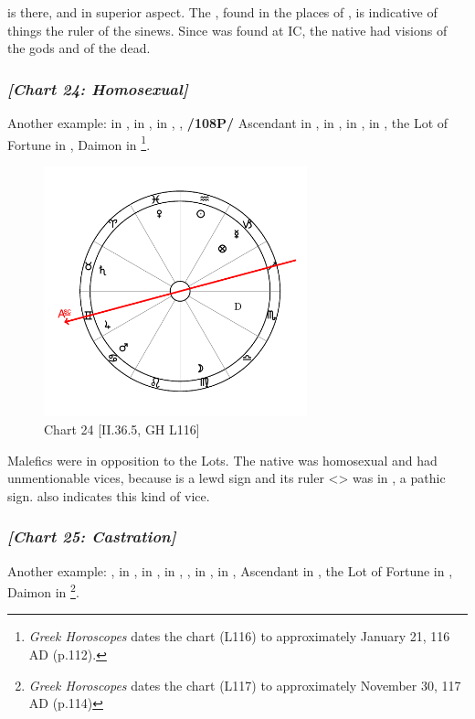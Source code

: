 \noindent \Mars\xspace is there, and \Saturn in superior aspect. The \Sun, found in the places of \Jupiter, is indicative of things the ruler of the sinews. Since \Saturn\xspace was found at IC, the native had visions of the gods and of the dead.

\newpage
\clearpage
\subsubsection{\textit{[Chart 24: Homosexual]}}
Another example: \Sun\xspace in \Aquarius, \Moon\xspace in \Virgo, \Saturn\xspace in \Taurus, \Jupiter, \textbf{/108P/} Ascendant in \Gemini, \Mars\xspace in \Cancer, \Venus\xspace in \Pisces, \Mercury\xspace in \Capricorn, the Lot of Fortune in \Capricorn, Daimon in \Scorpio
\footnote{\textit{Greek Horoscopes} dates the chart (L116) to approximately January 21, 116 AD (p.112).}.

\clearpage
\begin{figure}
\centering
\vspace{-30pt}
\includegraphics[width=0.68\textwidth]{charts/2_36_5}
\caption{Chart 24 [II.36.5, GH L116]}
\label{fig:chart24}
\end{figure}

\noindent Malefics were in opposition to the Lots. The native was homosexual and had unmentionable vices, because \Capricorn\xspace is a lewd sign and its ruler <\Saturn> was in \Taurus, a pathic sign. \Scorpio\xspace also indicates this kind of vice.

\newpage
\subsubsection{\textit{[Chart 25: Castration]}}
Another example: \Sun, \Venus\xspace in \Sagittarius, \Moon\xspace in \Cancer, \Saturn\xspace in \Gemini, \Jupiter, \Mars\xspace in \Leo, \Mercury\xspace in \Scorpio, Ascendant in \Capricorn, the Lot of Fortune in \Leo, Daimon in \Gemini
\footnote{\textit{Greek Horoscopes} dates the chart (L117) to approximately November 30, 117 AD (p.114)}. 

